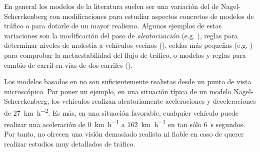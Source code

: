 
En general los modelos de la literatura suelen ser una variación del de Nagel-Scherckenberg con modificaciones para estudiar aspectos concretos de modelos de tráfico o para dotarle de un mayor realismo. Algunos ejemplos de estas variaciones son la modificación del paso de \textit{aleatorización} (e.g. \cite{Barlovic1998}), reglas para determinar niveles de molestia a vehículos vecinos (\cite{Wagner1997}), celdas más pequeñas (e.g. \cite{Krauss1997}) para comprobar la metaestabilidad del flujo de tráfico, o modelos y reglas para cambio de carril en vías de dos carriles (\cite{Brilon1999, Nagel1998}).

Los modelos basados en  no son suficientemente realistas desde un punto de vista microscópico. Por poner un ejemplo, en una situación típica de un modelo Nagel-Scherckenberg, los vehículos realizan aleatoriamente aceleraciones y deceleraciones de \SI{27}{\kilo\meter\per\square\hour}. Es más, en una situación favorable, cualquier vehículo puede realizar una aceleración de \SI{0}{\kilo\meter\per\hour} a \SI{162}{\kilo\meter\per\hour} en tan sólo \SI{6}{\second} segundos. Por tanto, no ofrecen una visión demasiado realista ni fiable en caso de querer realizar estudios muy detallados de tráfico.

